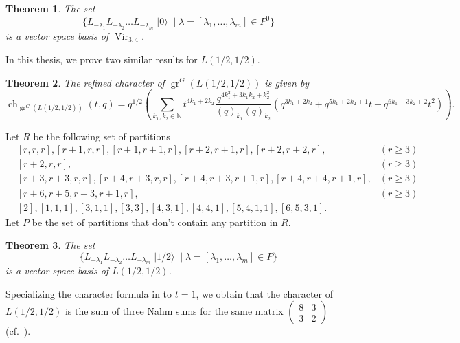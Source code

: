 \documentclass[a4paper, 12pt, reqno]{amsart}
\newtheorem{theorem}{Theorem}[section]
\theoremstyle{remark}
\numberwithin{equation}{subsection}
\DeclareMathOperator{\Vir}{Vir}
\DeclareMathOperator{\gr}{gr}
\DeclareMathOperator{\ch}{ch}
\DeclareMathOperator{\vac}{|0\rangle}
\DeclareMathOperator{\vachalf}{|1/2\rangle}
\begin{document}
\begin{theorem}
  \label{thr:2}
  The set
  \begin{equation*}
    \{L_{-\lambda_1}L_{-\lambda_2}\dots L_{-\lambda_m}\vac \mid \lambda = [\lambda_1, \dots, \lambda_m] \in P^0\}
  \end{equation*}
  is a vector space basis of $\Vir_{3, 4}$.
\end{theorem}

In this thesis, we prove two similar results for $L(1/2, 1/2)$.

\begin{theorem}
  \label{thr:3}
  The refined character of $\gr^G(L(1/2, 1/2))$ is given by
  \begin{equation*}
    \ch_{\gr^G(L(1/2, 1/2))}(t, q) = q^{1/2}\left(\sum_{k_1, k_2 \in \mathbb{N}}t^{4k_1 + 2k_2}\frac{q^{4k_1^2 + 3k_1k_2 + k_2^2}}{(q)_{k_1}(q)_{k_2}}(q^{3k_1 + 2k_2} + q^{5k_1 + 2k_2 + 1}t + q^{6k_1 + 3k_2 + 2}t^2)\right).
  \end{equation*}
\end{theorem}

Let $R$ be the following set of partitions
\begin{equation*}
  \begin{aligned}
  &[r, r, r], [r + 1, r, r], [r + 1, r + 1, r], [r + 2, r + 1, r], [r + 2, r + 2, r], &(r \ge 3) \\
  &[r + 2, r, r], &(r \ge 3) \\
  &[r + 3, r + 3, r, r], [r + 4, r + 3, r, r],  [r + 4, r + 3, r + 1, r], [r + 4, r + 4, r + 1, r], &(r \ge 3)\\
  &[r + 6, r + 5, r + 3, r + 1, r], &(r \ge 3) \\
  &[2], [1, 1, 1], [3, 1, 1], [3, 3], [4, 3, 1], [4, 4, 1], [5, 4, 1, 1], [6, 5, 3, 1].
  \end{aligned}
\end{equation*}
Let $P$ be the set of partitions that don't contain any partition in $R$.

\begin{theorem}
  \label{thr:4}
  The set
  \begin{equation*}
    \{L_{-\lambda_1}L_{-\lambda_2}\dots L_{-\lambda_m}\vachalf \mid \lambda = [\lambda_1, \dots, \lambda_m] \in P\}
  \end{equation*}
  is a vector space basis of $L(1/2, 1/2)$.
\end{theorem}

Specializing the character formula in  to $t = 1$, we obtain that the character of $L(1/2, 1/2)$ is the sum of three Nahm sums for the same matrix $\left(\begin{smallmatrix} 8 & 3 \\ 3 & 2 \end{smallmatrix}\right)$ (cf.\ \cite{Nahm2007}).
\end{document}
